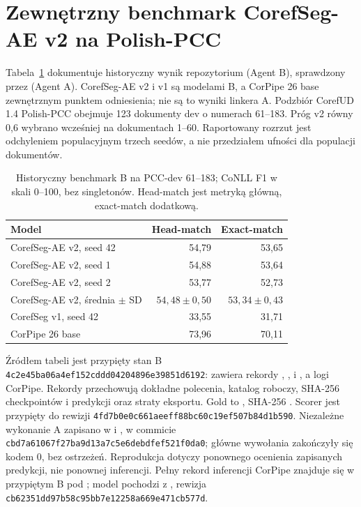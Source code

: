 \section{Zewnętrzny benchmark CorefSeg-AE v2 na Polish-PCC}
\label{sec:benchmark-b-pcc}

Tabela~\ref{tab:benchmark-b-pcc} dokumentuje historyczny wynik repozytorium  (Agent B), sprawdzony przez  (Agent A). CorefSeg-AE v2 i v1 są modelami B, a CorPipe 26 base zewnętrznym punktem odniesienia; nie są to wyniki linkera A. Podzbiór CorefUD 1.4 Polish-PCC obejmuje 123 dokumenty dev o numerach 61--183. Próg v2 równy 0,6 wybrano wcześniej na dokumentach 1--60. Raportowany rozrzut jest odchyleniem populacyjnym trzech seedów, a nie przedziałem ufności dla populacji dokumentów.

\begin{table}[htbp]
  \centering
  \caption{Historyczny benchmark B na PCC-dev 61--183; CoNLL F1 w skali 0--100, bez singletonów. Head-match jest metryką główną, exact-match dodatkową.}
  \label{tab:benchmark-b-pcc}
  \begin{tabular}{lrr}
    \toprule
    Model & Head-match & Exact-match \\
    \midrule
    CorefSeg-AE v2, seed 42 & 54,79 & 53,65 \\
    CorefSeg-AE v2, seed 1 & 54,88 & 53,64 \\
    CorefSeg-AE v2, seed 2 & 53,77 & 52,73 \\
    CorefSeg-AE v2, średnia $\pm$ SD & $54,48 \pm 0,50$ & $53,34 \pm 0,43$ \\
    CorefSeg v1, seed 42 & 33,55 & 31,71 \\
    CorPipe 26 base & 73,96 & 70,11 \\
    \bottomrule
  \end{tabular}
\end{table}

\begingroup
\small\raggedright
Źródłem tabeli jest przypięty stan B
\texttt{4c2e45ba06a4ef152cddd04204896e39851d6192}:
 zawiera rekordy
, ,
 i , a
 logi CorPipe.
Rekordy przechowują dokładne polecenia, katalog roboczy, SHA-256 checkpointów i predykcji oraz straty eksportu.
Gold to , SHA-256
.
Scorer jest przypięty do rewizji
\texttt{4fd7b0e0c661aeeff88bc60c19ef507b84d1b590}.
Niezależne wykonanie A zapisano w 
i , w commicie
\texttt{cbd7a61067f27ba9d13a7c5e6debdfef521f0da0}; główne wywołania zakończyły się kodem 0,
bez ostrzeżeń. Reprodukcja dotyczy ponownego ocenienia zapisanych predykcji, nie ponownej inferencji.
Pełny rekord inferencji CorPipe znajduje się w przypiętym B pod
; model pochodzi z
, rewizja
\texttt{cb62351dd97b58c95bb7e12258a669e471cb577d}.
\par\endgroup

